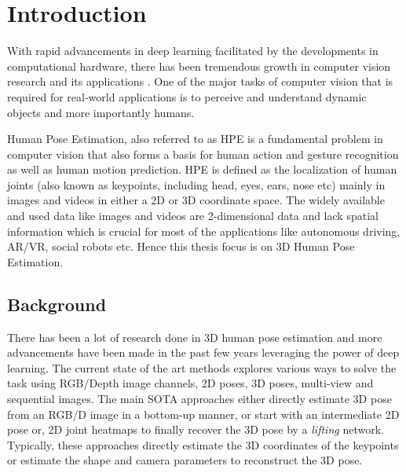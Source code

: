 \chapter{Introduction}
\label{chap:introduction}
With rapid advancements in deep learning facilitated by the developments in computational hardware, there has been tremendous growth in computer vision research and its applications \cite{AIandCompute}. One of the major tasks of computer vision that is required for real-world applications is to perceive and understand dynamic objects and more importantly humans.  

Human Pose Estimation, also referred to as HPE is a fundamental problem in computer vision that also forms a basis for human action and gesture recognition as well as human motion prediction. \ac{HPE} is defined as the localization of human joints (also known as keypoints, including head, eyes, ears, nose etc) mainly in images and videos in either a 2D or 3D coordinate space. The widely available and used data like images and videos are 2-dimensional data and lack spatial information which is crucial for most of the applications like autonomous driving, \ac{AR/VR}, social robots etc. Hence this thesis focus is on 3D Human Pose Estimation.



\section{Background}
\label{sec:background}

There has been a lot of research done in 3D human pose estimation and more advancements have been made in the past few years leveraging the power of deep learning. The current state of the art methods explores various ways to solve the task using \ac{RGB}/Depth image channels, 2D poses, 3D poses, multi-view and sequential images. The main \ac{SOTA} approaches either directly estimate 3D pose from an \ac{RGB}/D image in a bottom-up manner, or start with an intermediate 2D pose or, 2D joint heatmaps to finally recover the 3D pose by a \textit{lifting} network. Typically, these approaches directly estimate the 3D coordinates of the keypoints or estimate the shape and camera parameters to reconstruct the 3D pose.

